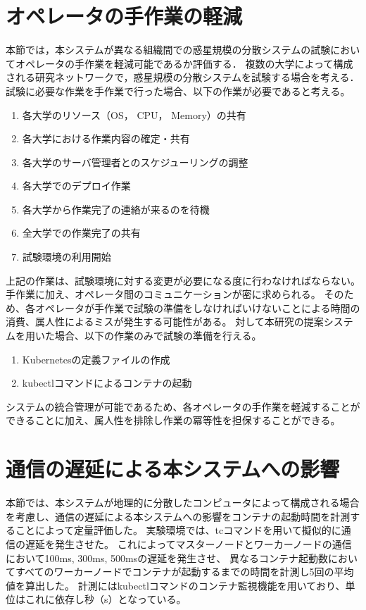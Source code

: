 \section{オペレータの手作業の軽減}

本節では，本システムが異なる組織間での惑星規模の分散システムの試験においてオペレータの手作業を軽減可能であるか評価する．
複数の大学によって構成される研究ネットワークで，惑星規模の分散システムを試験する場合を考える．
試験に必要な作業を手作業で行った場合、以下の作業が必要であると考える。

\begin{enumerate}
  \item 各大学のリソース（OS， CPU， Memory）の共有
  \item 各大学における作業内容の確定・共有
  \item 各大学のサーバ管理者とのスケジューリングの調整
  \item 各大学でのデプロイ作業
  \item 各大学から作業完了の連絡が来るのを待機
  \item 全大学での作業完了の共有
  \item 試験環境の利用開始
\end{enumerate}

上記の作業は、試験環境に対する変更が必要になる度に行わなければならない。
手作業に加え、オペレータ間のコミュニケーションが密に求められる。
そのため、各オペレータが手作業で試験の準備をしなければいけないことによる時間の消費、属人性によるミスが発生する可能性がある。
対して本研究の提案システムを用いた場合、以下の作業のみで試験の準備を行える。

\begin{enumerate}
  \item Kubernetesの定義ファイルの作成
  \item kubectlコマンドによるコンテナの起動
\end{enumerate}

システムの統合管理が可能であるため、各オペレータの手作業を軽減することができることに加え、属人性を排除し作業の冪等性を担保することができる。

\section{通信の遅延による本システムへの影響}

本節では、本システムが地理的に分散したコンピュータによって構成される場合を考慮し、通信の遅延による本システムへの影響をコンテナの起動時間を計測することによって定量評価した。
実験環境では、tcコマンドを用いて擬似的に通信の遅延を発生させた。
これによってマスターノードとワーカーノードの通信において100ms, 300ms, 500msの遅延を発生させ、
異なるコンテナ起動数においてすべてのワーカーノードでコンテナが起動するまでの時間を計測し5回の平均値を算出した。
計測にはkubectlコマンドのコンテナ監視機能を用いており、単位はこれに依存し秒（s）となっている。

